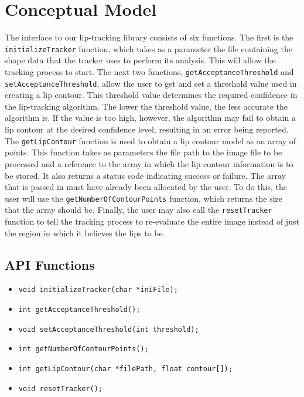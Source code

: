 \chapter{Conceptual Model}

The interface to our lip-tracking library consists of six functions. The first is the \texttt{initializeTracker} function, which takes as a parameter the file containing the shape data that the tracker uses to perform its analysis. This will allow the tracking process to start. The next two functions, \texttt{getAcceptanceThreshold} and \texttt{setAcceptanceThreshold}, allow the user to get and set a threshold value used in creating a lip contour. This threshold value determines the required confidence in the lip-tracking algorithm. The lower the threshold value, the less accurate the algorithm is. If the value is too high, however, the algorithm may fail to obtain a lip contour at the desired confidence level, resulting in an error being reported. The \texttt{getLipContour} function is used to obtain a lip contour model as an array of points. This function takes as parameters the file path to the image file to be processed and a reference to the array in which the lip contour information is to be stored. It also returns a status code indicating success or failure. The array that is passed in must have already been allocated by the user. To do this, the user will use the \texttt{getNumberOfContourPoints} function, which returns the size that the array should be. Finally, the user may also call the \texttt{resetTracker} function to tell the tracking process to re-evaluate the entire image instead of just the region in which it believes the lips to be.

\section{API Functions}
\begin{itemize}
\item \texttt{void initializeTracker(char *iniFile);}
\item \texttt{int getAcceptanceThreshold();}
\item \texttt{void setAcceptanceThreshold(int threshold);}
\item \texttt{int getNumberOfContourPoints();}
\item \texttt{int getLipContour(char *filePath, float contour[]);}
\item \texttt{void resetTracker();}
\end{itemize}